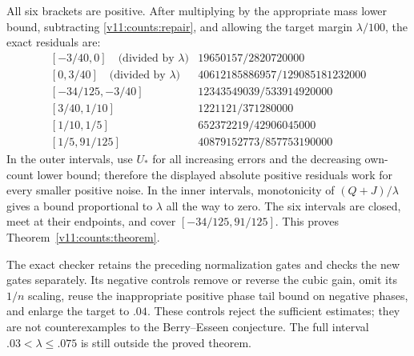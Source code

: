 All six brackets are positive. After multiplying by the appropriate
mass lower bound, subtracting \eqref{v11:counts:repair}, and allowing
the target margin $\lambda/100$, the exact residuals are:
\[
\begin{array}{c|c}
{[-3/40,0]}\quad\text{(divided by $\lambda$)}&19650157/2820720000\\
{[0,3/40]}\quad\text{(divided by $\lambda$)}&40612185886957/129085181232000\\
{[-34/125,-3/40]}&12343549039/533914920000\\
{[3/40,1/10]}&1221121/371280000\\
{[1/10,1/5]}&652372219/42906045000\\
{[1/5,91/125]}&40879152773/857753190000
\end{array}
\]
In the outer intervals, use $U_*$ for all increasing errors and the
decreasing own-count lower bound; therefore the displayed absolute
positive residuals work for every smaller positive noise. In the inner
intervals, monotonicity of $(Q+J)/\lambda$ gives a bound proportional
to $\lambda$ all the way to zero. The six intervals are closed, meet
at their endpoints, and cover $[-34/125,91/125]$.
This proves Theorem~\ref{v11:counts:theorem}.

The exact checker retains the preceding normalization gates and checks
the new gates separately. Its negative controls remove or reverse the
cubic gain, omit its $1/n$ scaling, reuse the inappropriate positive
phase tail bound on negative phases, and enlarge the target to $.04$.
These controls reject the sufficient estimates; they are not
counterexamples to the Berry--Esseen conjecture. The full interval
$.03<\lambda\le.075$ is still outside the proved theorem.
